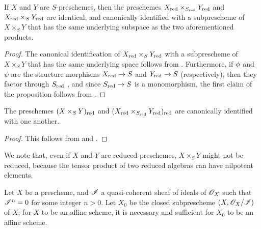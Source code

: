 \begin{proposition}[5.1.7]
\label{1.5.1.7}
If $X$ and $Y$ are $S$-preschemes, then the preschemes $X_{\mathrm{red}}\times_{S_{\mathrm{red}}}Y_{\mathrm{red}}$ and $X_{\mathrm{red}}\times_S Y_{\mathrm{red}}$ are identical, and canonically identified with a subprescheme of $X\times_S Y$ that has the same underlying subspace as the two aforementioned products.
\end{proposition}

\begin{proof}
\label{proof-1.5.1.7}
The canonical identification of $X_{\mathrm{red}}\times_S Y_{\mathrm{red}}$ with a subprescheme of $X\times_S Y$ that has the same underlying space follows from .
Furthermore, if $\phi$ and $\psi$ are the structure morphisms $X_\red\to S$ and $Y_\red\to S$ (respectively), then they factor through $S_{\mathrm{red}}$ , and since $S_\red\to S$ is a monomorphism, the first claim of the proposition follows from .
\end{proof}

\begin{corollary}[5.1.8]
\label{1.5.1.8}
The preschemes $(X\times_S Y)_{\mathrm{red}}$ and $(X_{\mathrm{red}}\times_{S_{\mathrm{red}}}Y_{\mathrm{red}})_{\mathrm{red}}$ are canonically identified with one another.
\end{corollary}

\begin{proof}
\label{proof-1.5.1.8}
This follows from  and .
\end{proof}

We note that, even if $X$ and $Y$ are reduced preschemes, $X\times_S Y$ might not be reduced, because the tensor product of two reduced algebras can have nilpotent elements.

\begin{proposition}[5.1.9]
\label{1.5.1.9}
Let $X$ be a prescheme, and $\mathscr{I}$ a quasi-coherent sheaf of ideals of $\mathscr{O}_X$ such that $\mathscr{I}^n=0$ for some integer $n>0$.
Let $X_0$ be the closed subprescheme $(X,\mathscr{O}_X/\mathscr{I})$ of $X$;
for $X$ to be an affine scheme, it is necessary and sufficient for $X_0$ to be an affine scheme.
\end{proposition}

